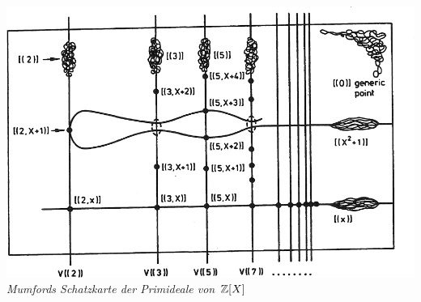 \documentclass[entwurf]{uebblatt}
\begin{document}
\centering
\href{http://www.neverendingbooks.org/mumfords-treasure-map}{\includegraphics[scale=0.2]{images/mumfords-treasure-map}} \\[0.5em]
\small
\emph{Mumfords Schatzkarte der Primideale von~$\mathbb{Z}[X]$}
\end{document}
